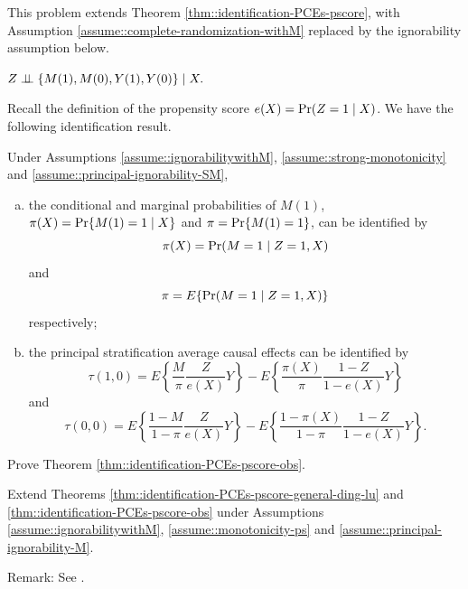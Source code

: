 \begin{HomeworkProblem}\label{exr:26-3}

This problem extends Theorem \ref{thm::identification-PCEs-pscore}, with Assumption \ref{assume::complete-randomization-withM} replaced by the ignorability assumption below.


\begin{assumption}
\label{assume::ignorabilitywithM}
$
Z\mathrel{\perp\!\!\!\perp} \{ M(1), M(0), Y(1) , Y(0) \} \mid X.
$
\end{assumption}

Recall the definition of the propensity score $e(X) = \operatorname{Pr}(Z=1\mid X)$.
We have the following identification result.


\begin{Theorem}
\label{thm::identification-PCEs-pscore-obs}
Under Assumptions \ref{assume::ignorabilitywithM}, \ref{assume::strong-monotonicity} and \ref{assume::principal-ignorability-SM},
\begin{enumerate}
[(a)]
\item
the conditional and marginal probabilities of $M(1)$,
$\pi(X) =  \operatorname{Pr}\{ M(1)=1\mid X \}  $ and $\pi =  \operatorname{Pr}\{ M(1)=1\} $, can be identified by
\[
\pi(X)   =  \operatorname{Pr}(M=1\mid Z=1, X )
\]
and
\[
\pi  =  E\{\operatorname{Pr}(M=1\mid Z=1, X ) \}
\]
respectively;
\item
the principal  stratification average causal effects can be identified by
\[
\tau(1,0) = E\left\{   \frac{M}{\pi}   \frac{Z}{e(X)} Y \right\}
- E\left\{   \frac{ \pi(X)  }{\pi}   \frac{1-Z}{1-e(X)} Y    \right\}
\]
and
\[
\tau(0,0) = E\left\{   \frac{1-M}{1-\pi}   \frac{Z}{e(X)} Y \right\}
- E\left\{   \frac{ 1- \pi(X)  }{1 - \pi}   \frac{1-Z}{1-e(X)} Y    \right\} .
\]
\end{enumerate}
\end{Theorem}


Prove Theorem \ref{thm::identification-PCEs-pscore-obs}.





\end{HomeworkProblem}

\begin{HomeworkProblem}\label{exr:26-4}

Extend Theorems \ref{thm::identification-PCEs-pscore-general-ding-lu} and \ref{thm::identification-PCEs-pscore-obs} under Assumptions  \ref{assume::ignorabilitywithM}, \ref{assume::monotonicity-ps} and \ref{assume::principal-ignorability-M}.


Remark: See \citet{jiang2020multiply}.


\end{HomeworkProblem}

